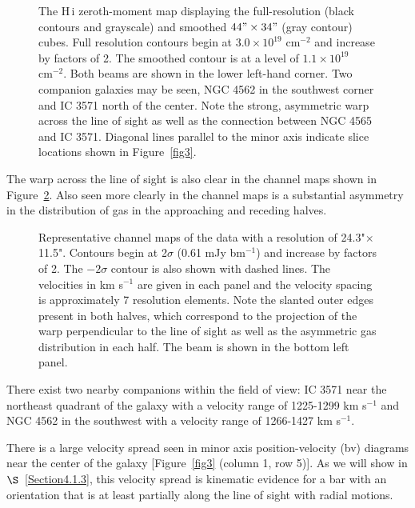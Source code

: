 \documentclass{emulateapj}
\begin{document}
\begin{figure}
\caption{The {\sc H\,i} zeroth-moment map displaying the full-resolution (black contours and grayscale) and smoothed $44"\times34"$ (gray contour) cubes.  Full resolution contours begin at $3.0\times10^{19}$ $\mathrm{cm^{-2}}$ and increase by factors of 2.  The smoothed contour is at a level of $1.1\times10^{19}$ $\mathrm{cm^{-2}}$.  Both beams are shown in the lower left-hand corner.  Two companion galaxies may be seen, NGC 4562 in the southwest corner and IC 3571 north of the center.  Note the strong, asymmetric warp across the line of sight as well as the connection between NGC 4565 and IC 3571.  Diagonal lines parallel to the minor axis indicate slice locations shown in Figure~\ref{fig3}.  \label{fig1}}
\end{figure}

\par
    The warp across the line of sight is also clear in the channel maps shown in Figure~\ref{fig2}.  Also seen more clearly in the channel maps is a substantial asymmetry in the distribution of gas in the approaching and receding halves.  


\begin{figure}
\caption{Representative channel maps of the data with a resolution of 24.3"$\times$11.5".  Contours begin at 2$\sigma$ (0.61 mJy bm$^{-1}$) and increase by factors of 2. The $-2\sigma$ contour is also shown with dashed lines. The velocities in km s$^{-1}$ are given in each panel and the velocity spacing is approximately 7 resolution elements.  Note the slanted outer edges present in both halves, which correspond to the projection of the warp perpendicular to the line of sight as well as the asymmetric gas distribution in each half.  The beam is shown in the bottom left panel.  \label{fig2}}
\end{figure}


\par
    There exist two nearby companions within the field of view: IC 3571 near the northeast quadrant of the galaxy with a velocity range of 1225-1299 km s$^{-1}$ and NGC 4562 in the southwest with a velocity range of 1266-1427 km s$^{-1}$.

\par
    There is a large velocity spread seen in minor axis position-velocity (bv) diagrams near the center of the galaxy [Figure~\ref{fig3} (column 1, row 5)].  As we will show in $\S$~\ref{Section4.1.3}, this velocity spread is kinematic evidence for a bar with an orientation that is at least partially along the line of sight with radial motions.
\end{document}
